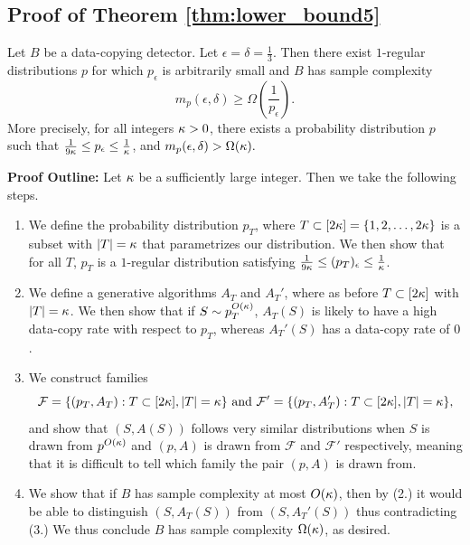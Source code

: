 \subsection{Proof of Theorem \ref{thm:lower_bound5}}


\begin{theorem} Let $B$ be a data-copying detector. Let $\epsilon = \delta = \frac{1}{3}$. Then there exist $1$-regular distributions $p$ for which $p_\epsilon$ is arbitrarily small and $B$ has sample complexity $$m_p(\epsilon, \delta) \geq \Omega(\frac{1}{p_\epsilon}).$$ More precisely, for all integers $\kappa > 0$, there exists a probability distribution $p$ such that $\frac{1}{9\kappa} \leq p_\epsilon \leq \frac{1}{\kappa}$, and $m_p(\epsilon, \delta) > \Omega(\kappa).$ 
\end{theorem}

\textbf{Proof Outline:} Let $\kappa$ be a sufficiently large integer. Then we take the following steps.
\begin{enumerate}
	\item We define the probability distribution $p_T$, where $T \subset [2\kappa] = \{1, 2, \dots, 2\kappa\}$ is a subset with $|T|=\kappa$ that parametrizes our distribution. We then show that for all $T$, $p_T$ is a $1$-regular distribution satisfying $\frac{1}{9\kappa} \leq (p_T)_\epsilon \leq \frac{1}{\kappa}$. 
	\item We define a generative algorithms $A_T$ and $A_T'$, where as before $T \subset [2\kappa]$ with $|T| = \kappa$. We then show that if $S \sim p_T^{O(\kappa)}$, $A_T(S)$ is likely to have a high data-copy rate with respect to $p_T$, whereas $A_T'(S)$ has a data-copy rate of $0$.
	\item We construct families $$\mathcal{F} =\{(p_T, A_T): T \subset [2\kappa], |T| = \kappa\}\text{ and }\mathcal{F}' = \{(p_T, A_T'): T \subset [2\kappa], |T| = \kappa\},$$ and show that $(S, A(S))$ follows very similar distributions when $S$ is drawn from $p^{O(\kappa)}$ and $(p, A)$ is drawn from $\mathcal{F}$ and $\mathcal{F}'$ respectively, meaning that it is difficult to tell which family the pair $(p, A)$ is drawn from. 
	\item We show that if $B$ has sample complexity at most $O(\kappa)$, then by (2.) it would be able to distinguish $(S, A_T(S))$ from $(S, A_T'(S))$ thus contradicting (3.) We thus conclude $B$ has sample complexity $\Omega(\kappa)$, as desired. 
\end{enumerate}

